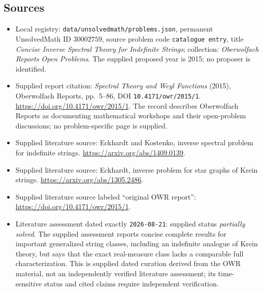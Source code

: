 \documentclass[11pt]{article}
\begin{document}
\subsection{Sources}
\begin{itemize}
\item Local registry: \texttt{data/unsolvedmath/problems.json}, permanent UnsolvedMath ID \(30002759\), source problem code \texttt{catalogue entry}, title \emph{Concise Inverse Spectral Theory for Indefinite Strings}; collection: \emph{Oberwolfach Reports Open Problems}. The supplied proposed year is 2015; no proposer is identified.
\item Supplied report citation: \emph{Spectral Theory and Weyl Functions} (2015), Oberwolfach Reports, pp.\ 5--86, DOI \texttt{10.4171/owr/2015/1}. \url{https://doi.org/10.4171/owr/2015/1}. The record describes Oberwolfach Reports as documenting mathematical workshops and their open-problem discussions; no problem-specific page is supplied.
\item Supplied literature source: Eckhardt and Kostenko, inverse spectral problem for indefinite strings. \url{https://arxiv.org/abs/1409.0139}.
\item Supplied literature source: Eckhardt, inverse problem for star graphs of Krein strings. \url{https://arxiv.org/abs/1305.2486}.
\item Supplied literature source labeled ``original OWR report'': \url{https://doi.org/10.4171/owr/2015/1}.
\item Literature assessment dated exactly \texttt{2026-08-21}: supplied status \emph{partially solved}. The supplied assessment reports concise complete results for important generalized string classes, including an indefinite analogue of Krein theory, but says that the exact real-measure class lacks a comparable full characterization. This is supplied dated curation derived from the OWR material, not an independently verified literature assessment; its time-sensitive status and cited claims require independent verification.
\end{itemize}
\end{document}
